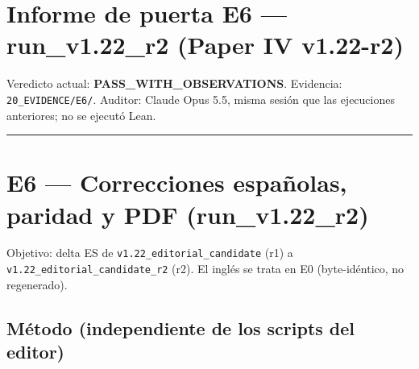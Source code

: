 \documentclass[
]{article}
\author{}
\date{}
\begin{document}
\section{Informe de puerta E6 --- run\_v1.22\_r2 (Paper IV
v1.22-r2)}\label{informe-de-puerta-e6--run_v122_r2-paper-iv-v122-r2}

Veredicto actual: \textbf{PASS\_WITH\_OBSERVATIONS}. Evidencia:
\texttt{20\_EVIDENCE/E6/}. Auditor: Claude Opus 5.5, misma sesión que
las ejecuciones anteriores; no se ejecutó Lean.

\begin{center}\rule{0.5\linewidth}{0.5pt}\end{center}

\section{E6 --- Correcciones españolas, paridad y PDF
(run\_v1.22\_r2)}\label{e6--correcciones-espauxf1olas-paridad-y-pdf-run_v122_r2}

Objetivo: delta ES de \texttt{v1.22\_editorial\_candidate} (r1) a
\texttt{v1.22\_editorial\_candidate\_r2} (r2). El inglés se trata en E0
(byte-idéntico, no regenerado).

\subsection{Método (independiente de los scripts del
editor)}\label{muxe9todo-independiente-de-los-scripts-del-editor}
\end{document}
